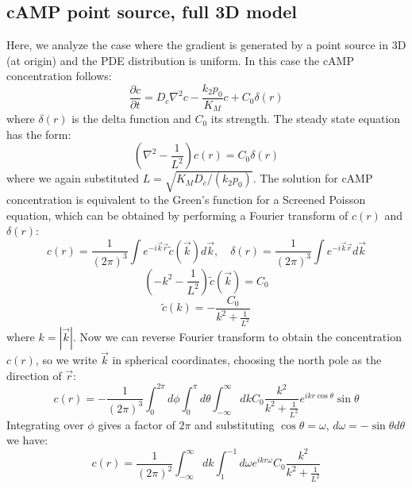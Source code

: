 \documentclass[10pt]{article}
\begin{document}
\subsection{cAMP point source, full 3D model}


Here, we analyze the case where the gradient is generated by a point source in 3D (at origin) and the PDE distribution is uniform. In this case the cAMP concentration follows:
\begin{equation}
	\frac{\partial c}{\partial t} = D_c \nabla^2 c - \frac{k_2 p_0}{K_M}c + C_0 \delta(r)
	\label{eq:pdeSpherical}
\end{equation}
where $\delta(r)$ is the delta function and $C_0$ its strength. The steady state equation has the form:
\begin{equation}
	\left(\nabla^2 - \frac{1}{L^2}\right)c(r) = C_0 \delta(r)
\end{equation}
where we again substituted $L = \sqrt{K_M D_c / (k_2 p_0)}$. The solution for cAMP concentration is equivalent to the Green's function for a Screened Poisson equation, which can be obtained by performing a Fourier transform of $c(r)$ and $\delta(r)$:
\begin{equation}
	c(r) = \frac{1}{(2\pi)^3} \int e^{-i\vec{k}\vec{r}} \tilde{c}(\vec{k}) d\vec{k},\quad 
	\delta (r) = \frac{1}{(2\pi)^3} \int e^{-i\vec{k}\vec{r}} d\vec{k}
\end{equation}
\begin{equation}
	\left(-k^2 - \frac{1}{L^2}\right)\tilde{c}(\vec{k}) = C_0
\end{equation}
\begin{equation}
	\tilde{c}(k) = -\frac{C_0}{k^2 + \frac{1}{L^2}}
\end{equation}
where $k = |\vec{k}|$. Now we can reverse Fourier transform to obtain the concentration $c(r)$, so we write $\vec{k}$ in spherical coordinates, choosing the north pole as the direction of $\vec{r}$:
\begin{equation}
	c(r) = - \frac{1}{(2\pi)^3}\int_0^{2\pi} d\phi \int_0^{\pi} d\theta \int_{-\infty}^{\infty} dk C_0 \frac{k^2}{k^2 + \frac{1}{L^2}} e^{ikr\cos\theta} \sin\theta
\end{equation}
Integrating over $\phi$ gives a factor of $2\pi$ and substituting $\cos\theta = \omega$, $d\omega = -\sin\theta d\theta$ we have:
\begin{equation}
	c(r) = \frac{1}{(2\pi)^2} \int_{-\infty}^{\infty} dk \int_1^{-1} d\omega e^{ikr\omega} C_0 \frac{k^2}{k^2 + \frac{1}{L^2}}
\end{equation}
\end{document}
